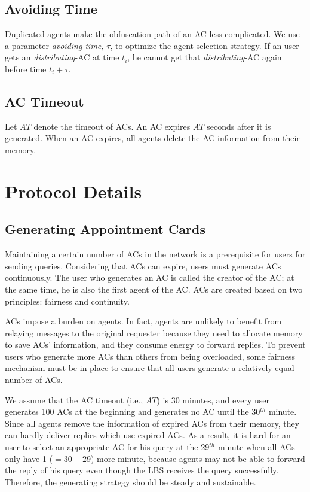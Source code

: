 \subsection{Avoiding Time} \label{subsubsecAvdTime}

Duplicated agents make the obfuscation path of an AC less complicated. We use a parameter \textit{avoiding time,} $\tau$, to optimize the agent selection strategy. If an user gets an \textit{distributing}-AC at time $t_i$, he cannot get that \textit{distributing}-AC again before time $t_i+\tau $.

\subsection{AC Timeout}

\noindent Let $AT$ denote the timeout of ACs. An AC expires $AT$ seconds after it is generated. When an AC expires, all agents delete the AC information from their memory.

\section{Protocol Details}


\subsection{Generating Appointment Cards}

\noindent Maintaining a certain number of ACs in the network is a prerequisite for users for sending queries. Considering that ACs can expire, users must generate ACs continuously. The user who generates an AC is called the creator of the AC; at the same time, he is also the first agent of the AC. ACs are created based on two principles: fairness and continuity. 

ACs impose a burden on agents. In fact, agents are unlikely to benefit from relaying messages to the original requester because they need to allocate memory to save ACs' information, and they consume energy to forward replies. To prevent users who generate more ACs than others from being overloaded, some fairness mechanism must be in place to ensure that all users generate a relatively equal number of ACs.

We assume that the AC timeout (i.e., $AT$) is 30 minutes, and every user generates 100 ACs at the beginning and generates no AC until the 30${}^{th}$ minute. Since all agents remove the information of expired ACs from their memory, they can hardly deliver replies which use expired ACs. As a result, it is hard for an user to select an appropriate AC for his query at the 29${}^{th}$ minute when all ACs only have 1 ($=30-29$) more minute, because agents may not be able to forward the reply of his query even though the LBS receives the query successfully. Therefore, the generating strategy should be steady and sustainable.

